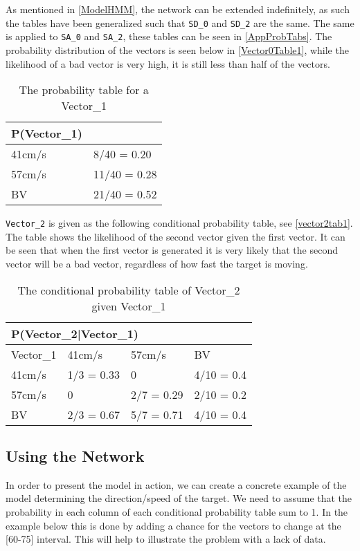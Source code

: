 As mentioned in \autoref{ModelHMM}, the network can be extended indefinitely,
as such the tables have been generalized such that \texttt{SD\_0} and
\texttt{SD\_2} are the same. The same is applied to \texttt{SA\_0} and
\texttt{SA\_2}, these tables can be seen in \autoref{AppProbTabs}. The probability
distribution of the vectors is seen below in \autoref{Vector0Table1}, while the
likelihood of a bad vector is very high, it is still less than half of the
vectors.

\begin{table}[H]
\centering
\begin{tabular}{|l|l|}
\hline
P(Vector\_1) &\\ \hline
41cm/s & 8/40 = 0.20   \\ \hline 
57cm/s & 11/40 = 0.28  \\ \hline
BV & 21/40 = 0.52  \\ \hline
\end{tabular}
\caption{The probability table for a Vector\_1}
\label{Vector0Table1}
\end{table}


\texttt{Vector\_2} is given as the following conditional probability table, see
\autoref{vector2tab1}. The table shows the likelihood of the second vector given
the first vector. It can be seen that when the first vector is generated it is
very likely that the second vector will be a bad vector, regardless of how fast
the target is moving.

\begin{table}[H]
\centering
\begin{tabular}{|l|l|l|l|}
\hline
\multicolumn{4}{|l|}{P(Vector\_2|Vector\_1)} \\ \hline
 Vector\_1 & 41cm/s    & 57cm/s    & BV    \\ \hline
 41cm/s    & 1/3 = 0.33 & 0     & 4/10 = 0.4    \\ \hline
 57cm/s    & 0          & 2/7 = 0.29 & 2/10 = 0.2  \\ \hline
 BV        & 2/3 = 0.67 & 5/7 = 0.71 & 4/10 = 0.4  \\ \hline
\end{tabular}
\caption{The conditional probability table of Vector\_2 given Vector\_1}
\label{vector2tab1}
\end{table}


\subsection{Using the Network}
In order to present the model in action, we can create a concrete example of the
model determining the direction/speed of the target. We need to assume that the
probability in each column of each conditional probability table sum to 1. In
the example below this is done by adding a chance for the vectors to change at
the [60-75] interval. This will help to illustrate the problem with a lack
of data.\nl

